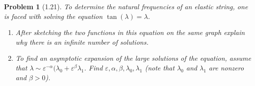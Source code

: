 \documentclass[11pt]{article}
\newcommand{\vep}{\varepsilon}
\theoremstyle{problemstyle}
\newtheorem{problem}{Problem}
\begin{document}
\newpage
\begin{problem}[1.21]
  To determine the natural frequencies of an elastic string, one is faced with solving the equation
  $\tan(\lambda) = \lambda$.
  \begin{enumerate}
    \item After sketching the two functions in this equation on the same graph explain why there is
      an infinite number of solutions.
    \item To find an asymptotic expansion of the large solutions of the equation, assume that
      $\lambda \sim \vep^{-\alpha}(\lambda_0 + \vep^\beta\lambda_1$. Find
      $\vep, \alpha, \beta, \lambda_0, \lambda_1$ (note that $\lambda_0$ and $\lambda_1$ are
      nonzero and $\beta > 0$).
  \end{enumerate}
\end{problem}
\end{document}
